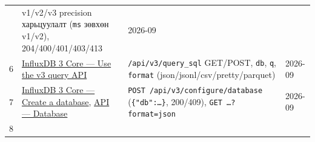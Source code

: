 \begin{longtable}[]{@{}llll@{}}
\begin{minipage}[t]{0.22\columnwidth}
\end{minipage} & \begin{minipage}[t]{0.22\columnwidth}\raggedright
v1/v2/v3 precision харьцуулалт (\texttt{ms} зөвхөн v1/v2), 204/400/401/403/413\strut
\end{minipage} & \begin{minipage}[t]{0.22\columnwidth}\raggedright
2026-09\strut
\end{minipage}\tabularnewline
\begin{minipage}[t]{0.22\columnwidth}\raggedright
6\strut
\end{minipage} & \begin{minipage}[t]{0.22\columnwidth}\raggedright
\href{https://docs.influxdata.com/influxdb3/core/query-data/execute-queries/influxdb-v3-api/}{InfluxDB 3 Core --- Use the v3 query API}\strut
\end{minipage} & \begin{minipage}[t]{0.22\columnwidth}\raggedright
\texttt{/\allowbreak{}api/\allowbreak{}v3/\allowbreak{}query\_\allowbreak{}sql} GET/POST, \texttt{db}, \texttt{q}, \texttt{format} (json/jsonl/csv/pretty/parquet)\strut
\end{minipage} & \begin{minipage}[t]{0.22\columnwidth}\raggedright
2026-09\strut
\end{minipage}\tabularnewline
\begin{minipage}[t]{0.22\columnwidth}\raggedright
7\strut
\end{minipage} & \begin{minipage}[t]{0.22\columnwidth}\raggedright
\href{https://docs.influxdata.com/influxdb3/core/admin/databases/create/}{InfluxDB 3 Core --- Create a database}, \href{https://docs.influxdata.com/influxdb3/core/api/database/}{API --- Database}\strut
\end{minipage} & \begin{minipage}[t]{0.22\columnwidth}\raggedright
\texttt{POST\ /\allowbreak{}api/\allowbreak{}v3/\allowbreak{}configure/\allowbreak{}database} (\texttt{\{"db":\ldots{}\}}, 200/409), \texttt{GET\ \ldots{}?\allowbreak{}format=\allowbreak{}json}\strut
\end{minipage} & \begin{minipage}[t]{0.22\columnwidth}\raggedright
2026-09\strut
\end{minipage}\tabularnewline
\begin{minipage}[t]{0.22\columnwidth}\raggedright
8\strut
\end{minipage} & \begin{minipage}[t]{0.22\columnwidth}\raggedright

\end{minipage}
\end{longtable}
